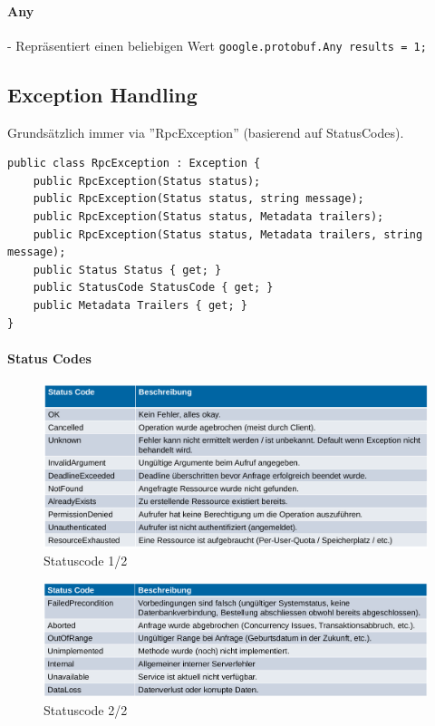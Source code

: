 \documentclass[
a4paper,
oneside,
10pt,
fleqn,
headsepline,
toc=listofnumbered, 
bibliography=totocnumbered]{scrartcl}
\begin{document}
\paragraph{Any} - Repräsentiert einen beliebigen Wert \lstinline{google.protobuf.Any results = 1;}

\subsection{Exception Handling}
Grundsätzlich immer via ''RpcException'' (basierend auf StatusCodes).
\begin{lstlisting}
public class RpcException : Exception {
    public RpcException(Status status);
    public RpcException(Status status, string message);
    public RpcException(Status status, Metadata trailers);
    public RpcException(Status status, Metadata trailers, string message);
    public Status Status { get; }
    public StatusCode StatusCode { get; }
    public Metadata Trailers { get; }
}
\end{lstlisting}
\paragraph{Status Codes} \hfill
\begin{figure}[!ht]
	\centering
	\includegraphics[width=0.95\linewidth]{images/grpc_status_codes_1.png}
	\caption{Statuscode 1/2}
\end{figure}
\begin{figure}[!ht]
	\centering
	\includegraphics[width=0.95\linewidth]{images/grpc_status_codes_2.png}
	\caption{Statuscode 2/2}
\end{figure}
\end{document}
